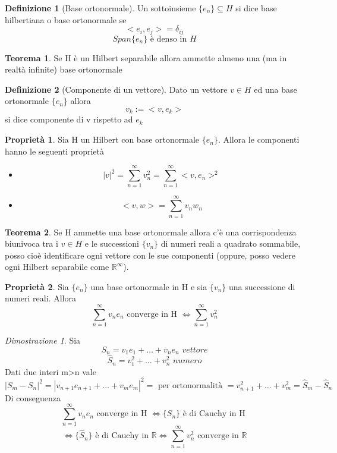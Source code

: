 \documentclass[a4paper]{book}
\theoremstyle{definition}
\newtheorem{defn}{Definizione}
\theoremstyle{remark}
\newtheorem{dimst}{Dimostrazione}
\theoremstyle{definition}
\newtheorem{teo}{Teorema}
\newtheorem{prop}{Proprietà}
\newcommand{\bbr}{\mathbb{R}}
\begin{document}
\begin{defn}[Base ortonormale]
	Un sottoinsieme $\{e_n\} \subseteq H$ si dice base hilbertiana o base ortonormale se 
	$$<e_i, e_j> = \delta_{ij}$$
	$$Span\{e_n\} \text{ è denso in } H$$
\end{defn}


\begin{teo}
	Se H è un Hilbert separabile allora ammette almeno una (ma in realtà infinite) base ortonormale
\end{teo}

\begin{defn}[Componente di un vettore]
	Dato un vettore $v \in H$ ed una base ortonormale $\{e_n\}$ allora $$v_k := <v, e_k>$$ si dice componente di v rispetto ad $e_k$
\end{defn}

\begin{prop}
	Sia H un Hilbert con base ortonormale $\{e_n\}$. Allora le componenti hanno le seguenti proprietà 
	\begin{itemize}
		\item $$|v|^2 = \sum_{n = 1}^{\infty}v_n^2 = \sum_{n=1}^{\infty} <v,e_n>^2$$
		\item $$<v,w> = \sum_{n=1}^{\infty}v_n w_n$$
	\end{itemize}
\end{prop}

\begin{teo}
	Se H ammette una base ortonormale allora c'è una corrispondenza biunivoca tra i $v \in H$ e le successioni $\{v_n\}$ di numeri reali a quadrato sommabile, posso cioè identificare ogni vettore con le sue componenti (oppure, posso vedere ogni Hilbert separabile come $\bbr^\infty$).  
\end{teo}

\begin{prop}
	Sia $\{e_n\}$ una base ortonormale in H e sia $\{v_n\}$ una successione di numeri reali. Allora 
	$$ \sum_{n=1}^{\infty}v_n e_n \text{ converge in H }\iff \sum_{n=1}^{\infty} v_n^2$$
\end{prop}

\begin{dimst}
	Sia 
	$$S_n = v_1e_1 + \dots + v_ne_n \textit{ vettore}$$
	$$\hat{S}_n = v_1^2 + \dots + v_n^2 \textit{ numero}$$
	Dati due interi m>n vale 
	$$|S_m - S_n|^2 = |v_{n+1}e_{n+1} + \dots + v_m e_m |^2 = \text{ per ortonormalità } = v_{n+1}^2 + \dots + v_m^2 = \hat{S}_m - \hat{S}_n$$
	Di conseguenza 
	$$\sum_{n=1}^{\infty}v_ne_n \text{ converge in H } \iff \{S_n\} \text{ è di Cauchy in H }$$ $$\iff \{\hat{S}_n\} \text{ è di Cauchy in }\bbr\iff \sum_{n=1}^{\infty}v_n^2 \text{ converge in }\bbr$$
\end{dimst}
\end{document}
